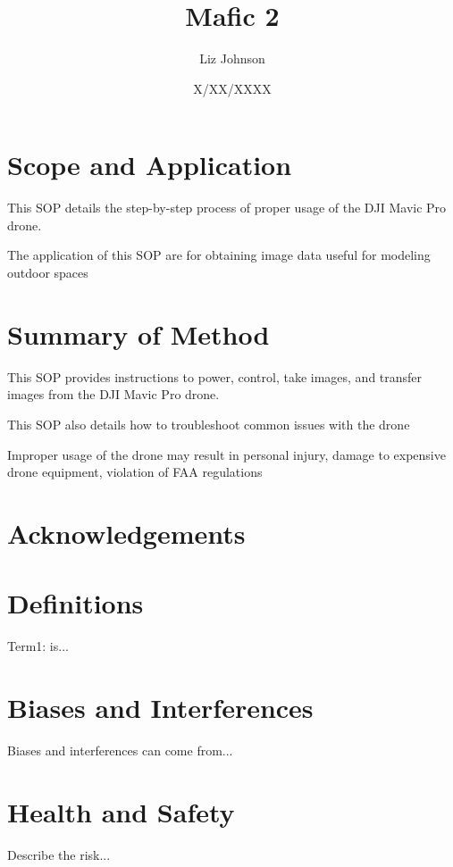 \documentclass[12pt]{../SOP4_alpha}\usepackage[]{graphicx}\usepackage[]{color}
\title{Mafic 2}
\date{X/XX/XXXX}
\author{Liz Johnson}
\begin{document}
\maketitle

\section{Scope and Application}

\NP This SOP details the step-by-step process of proper usage of the DJI Mavic Pro drone.

\NP The application of this SOP are for obtaining image data useful for modeling outdoor spaces

\section{Summary of Method}

\NP This SOP provides instructions to power, control, take images, and transfer images from the DJI Mavic Pro drone.

\NP This SOP also details how to troubleshoot common issues with the drone

\NP Improper usage of the drone may result in personal injury, damage to expensive drone equipment, violation of FAA regulations

\tableofcontents

\newpage

\section{Acknowledgements}

\section{Definitions}

\NP Term1: is...

\section{Biases and Interferences}

\NP Biases and interferences can come from...

\section{Health and Safety}

\NP Describe the risk...
\end{document}
